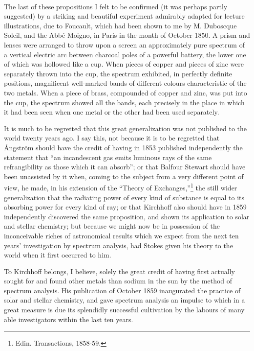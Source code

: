 \documentclass[a4paper, 11pt, oneside, english]{article}
\begin{document}
\paragraph{}
The last of these propositions I felt to be confirmed (it was perhaps partly suggested) by a striking and beautiful experiment admirably adapted for lecture illustrations, due to Foucault, which had been shown to me by M. Duboscque Soleil, and the Abbé Moigno, in Paris in the month of October 1850. A prism and lenses were arranged to throw upon a screen an approximately pure spectrum of a vertical electric arc between charcoal poles of a powerful battery, the lower one of which was hollowed like a cup. When pieces of copper and pieces of zinc were separately thrown into the cup, the spectrum exhibited, in perfectly definite positions, magnificent well-marked bands of different colours characteristic of the two metals. When a piece of brass, compounded of copper and zinc, was put into the cup, the spectrum showed all the bands, each precisely in the place in which it had been seen when one metal or the other had been used separately.

It is much to be regretted that this great generalization was not published to the world twenty years ago. I say this, not because it is to be regretted that Ångström should have the credit of having in 1853 published independently the statement that ``an incandescent gas emits luminous rays of the same refrangibility as those which it can absorb''; or that Balfour Stewart should have been unassisted by it when, coming to the subject from a very different point of view, he made, in his extension of the ``Theory of Exchanges,''\footnote{Edin. Transactions, 1858-59.} the still wider generalization that the radiating power of every kind of substance is equal to its absorbing power for every kind of ray; or that Kirchhoff also should have in 1859 independently discovered the same proposition, and shown its application to solar and stellar chemistry; but because we might now be in possession of the inconceivable riches of astronomical results which we expect from the next ten years' investigation by spectrum analysis, had Stokes given his theory to the world when it first occurred to him.

To Kirchhoff belongs, I believe, solely the great credit of having first actually sought for and found other metals than sodium in the sun by the method of spectrum analysis. His publication of October 1859 inaugurated the practice of solar and stellar chemistry, and gave spectrum analysis an impulse to which in a great measure is due its splendidly successful cultivation by the labours of many able investigators within the last ten years.
\end{document}
